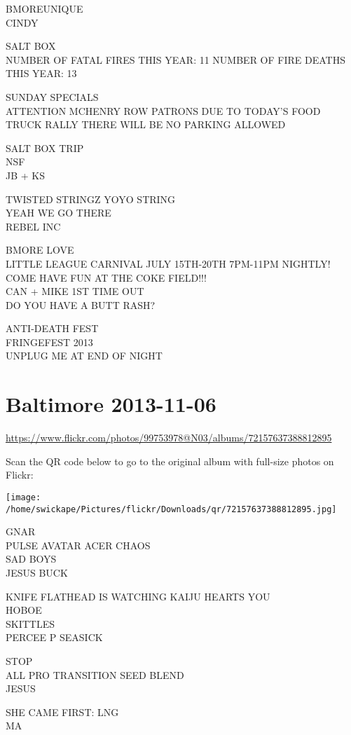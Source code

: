 \documentclass[10pt,letterpaper]{article}
\begin{document}
BMOREUNIQUE\\
CINDY

SALT BOX\\
NUMBER OF FATAL FIRES THIS YEAR: 11 NUMBER OF FIRE DEATHS THIS YEAR: 13

SUNDAY SPECIALS\\
ATTENTION MCHENRY ROW PATRONS DUE TO TODAY'S FOOD TRUCK RALLY THERE WILL BE NO PARKING ALLOWED

SALT BOX TRIP\\
NSF\\
JB + KS

TWISTED STRINGZ YOYO STRING\\
YEAH WE GO THERE\\
REBEL INC

BMORE LOVE\\
LITTLE LEAGUE CARNIVAL JULY 15TH{-}20TH 7PM{-}11PM NIGHTLY! COME HAVE FUN AT THE COKE FIELD!!!\\
CAN + MIKE 1ST TIME OUT\\
DO YOU HAVE A BUTT RASH?

ANTI{-}DEATH FEST\\
FRINGEFEST 2013\\
UNPLUG ME AT END OF NIGHT


\section*{Baltimore 2013-11-06}

\url{https://www.flickr.com/photos/99753978@N03/albums/72157637388812895}

Scan the QR code below to go to the original album with full-size photos on Flickr:

\texttt{[image: /home/swickape/Pictures/flickr/Downloads/qr/72157637388812895.jpg]}


GNAR\\
PULSE AVATAR ACER CHAOS\\
SAD BOYS\\
JESUS BUCK

KNIFE FLATHEAD IS WATCHING KAIJU HEARTS YOU\\
HOBOE\\
SKITTLES\\
PERCEE P SEASICK

STOP\\
ALL PRO TRANSITION SEED BLEND\\
JESUS

SHE CAME FIRST: LNG\\
MA
\end{document}
